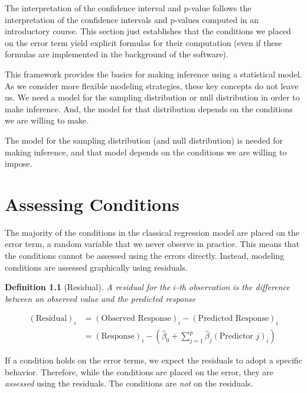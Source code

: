 \documentclass[
]{book}
\theoremstyle{plain}
\theoremstyle{mydefn}
\newtheorem{definition}{Definition}[chapter]
\theoremstyle{myexmpl}
\theoremstyle{remark}
\begin{document}
The interpretation of the confidence interval and p-value follows the interpretation of the confidence intervals and p-values computed in an introductory course. This section just establishes that the conditions we placed on the error term yield explicit formulas for their computation (even if these formulas are implemented in the background of the software).

This framework provides the basics for making inference using a statistical model. As we consider more flexible modeling strategies, these key concepts do not leave us. We need a model for the sampling distribution or null distribution in order to make inference. And, the model for that distribution depends on the conditions we are willing to make.

\begin{rmdkeyidea}
The model for the sampling distribution (and null distribution) is needed for making inference, and that model depends on the conditions we are willing to impose.
\end{rmdkeyidea}

\hypertarget{glm-assessing-conditions}{%
\chapter{Assessing Conditions}\label{glm-assessing-conditions}}

The majority of the conditions in the classical regression model are placed on the error term, a random variable that we never observe in practice. This means that the conditions cannot be assessed using the errors directly. Instead, modeling conditions are assessed graphically using residuals.

\begin{definition}[Residual]
A residual for the \(i\)-th observation is the difference between an observed value and the predicted response

\[
\begin{aligned}
  (\text{Residual})_i 
    &= (\text{Observed Response})_i - (\text{Predicted Response})_i \\
    &= (\text{Response})_i - \left(\widehat{\beta}_0 + \sum_{j=1}^{p} \widehat{\beta}_j (\text{Predictor } j)_i\right)
\end{aligned}
\]
\end{definition}

\begin{rmdkeyidea}
If a condition holds on the error terms, we expect the residuals to adopt a specific behavior. Therefore, while the conditions are placed on the error, they are \emph{assessed} using the residuals. The conditions are \emph{not} on the residuals.\\
\end{rmdkeyidea}
\end{document}
